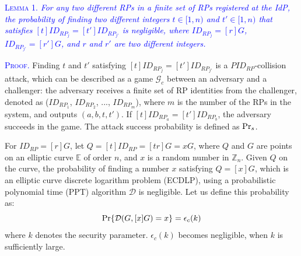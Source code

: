 \vspace{0.5mm}
\noindent\textcolor{blue}{\textsc{Lemma 1.} {\em  For any two different RPs in a finite set of RPs registered at the IdP, the probability of finding two different integers $t \in [1,n)$ and $t' \in [1,n)$ that satisfies $[t]ID_{RP_j} = [t']ID_{RP_{j'}}$ is negligible, where $ID_{RP_j}=[r]G$, $ID_{RP_{j'}}=[r']G$, and $r$ and $r'$ are two different integers.}}


\vspace{0.5mm}
\noindent\textcolor{blue}{\textsc{Proof.}} Finding $t$ and $t'$ satisfying $[t]ID_{RP_j} = [t']ID_{RP_{j'}}$ is a $PID_{RP}$-collision attack, which can be described as a game $\mathcal{G}_c$ between an adversary and a challenger: the adversary receives a finite set of RP identities from the challenger, denoted as ($ID_{RP_1}$, $ID_{RP_2}$, ..., $ID_{RP_m}$), where $m$ is the number of the RPs in the system, and outputs $(a, b, t, t')$.
If $[t]ID_{RP_a}=[t']ID_{RP_b}$, the adversary succeeds in the game.
The attack success probability is defined as ${\rm Pr}_s$. 

For $ID_{RP}=[r]G$, let $Q=[t]ID_{RP}=[tr]G=xG$, where $Q$ and $G$ are points on an elliptic curve $\mathbb{E}$ of order $n$, and $x$ is a random number in $\mathbb{Z}_n$. Given $Q$ on the curve, the probability of finding a number $x$ satisfying $Q = [x]G$, which is an elliptic curve discrete logarithm problem (ECDLP), using a probabilistic polynomial time (PPT) algorithm $\mathcal{D}$ is negligible. Let us define this probability as:
\begin{equation*}
{\rm Pr}\{\mathcal{D}(G, [x]G)=x\} = \epsilon_{c}(k)
\end{equation*}
where $k$ denotes the security parameter. $\epsilon_{c}(k)$ becomes negligible, when $k$ is sufficiently large.


